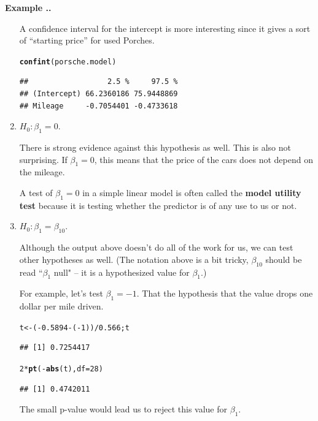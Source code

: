 \documentclass[twoside]{book}\usepackage[]{graphicx}\usepackage[]{xcolor}
\makeatletter
\newcommand{\hlnum}[1]{\textcolor[rgb]{0.686,0.059,0.569}{#1}}%
\newcommand{\hlopt}[1]{\textcolor[rgb]{0,0,0}{#1}}%
\newcommand{\hlstd}[1]{\textcolor[rgb]{0.345,0.345,0.345}{#1}}%
\newcommand{\hlkwb}[1]{\textcolor[rgb]{0.69,0.353,0.396}{#1}}%
\newcommand{\hlkwc}[1]{\textcolor[rgb]{0.333,0.667,0.333}{#1}}%
\newcommand{\hlkwd}[1]{\textcolor[rgb]{0.737,0.353,0.396}{\textbf{#1}}}%
\newenvironment{kframe}{%
 \def\at@end@of@kframe{}%
 \ifinner\ifhmode%
  \def\at@end@of@kframe{\end{minipage}}%
  \begin{minipage}{\columnwidth}%
 \fi\fi%
 \def\FrameCommand##1{\hskip\@totalleftmargin \hskip-\fboxsep
 \colorbox{shadecolor}{##1}\hskip-\fboxsep
     \hskip-\linewidth \hskip-\@totalleftmargin \hskip\columnwidth}%
 \MakeFramed {\advance\hsize-\width
   \@totalleftmargin\z@ \linewidth\hsize
   \@setminipage}}%
 {\par\unskip\endMakeFramed%
 \at@end@of@kframe}
\newenvironment{knitrout}{}{} %
\def\term#1{\textbf{#1}}
\newcounter{example}[section]
\newenvironment{example}%
{\refstepcounter{example}%
\textbf{Example \thesection.\arabic{example}. }}%
{}
\makeatother
\begin{document}
\begin{example}
\begin{enumerate}
		A confidence interval for the intercept is more interesting since it gives a sort 
		of ``starting price'' for used Porches.
\begin{knitrout}
\color{fgcolor}\begin{kframe}
\begin{alltt}
\hlkwd{confint}\hlstd{(porsche.model)}
\end{alltt}
\begin{verbatim}
##                  2.5 %     97.5 %
## (Intercept) 66.2360186 75.9448869
## Mileage     -0.7054401 -0.4733618
\end{verbatim}
\end{kframe}
\end{knitrout}


	\item
		$H_0: \beta_1 = 0$.

		There is strong evidence against this hypothesis as well.  This is also not surprising.
		If $\beta_1 = 0$, this means that the price of the cars does not depend on the mileage.

		A test of $\beta_1=0$ in a simple linear model is often called the \term{model utility test}
		because it is testing whether the predictor is of any use to us or not.

	\item
		$H_0: \beta_1 = \beta_{10}$.

		Although the output above doesn't do all of the work for us, we can test other
		hypotheses as well.  (The notation above is a bit tricky, $\beta_{10}$ should be read
		``$\beta_1$ null" -- it is a hypothesized value for $\beta_1$.)
		
		For example, let's test $\beta_1 = -1$.  That the hypothesis that the value 
		drops one dollar per mile driven.

\begin{knitrout}
\color{fgcolor}\begin{kframe}
\begin{alltt}
\hlstd{t} \hlkwb{<-} \hlstd{(}\hlopt{-}\hlnum{0.5894} \hlopt{-} \hlstd{(}\hlopt{-}\hlnum{1}\hlstd{) )} \hlopt{/} \hlnum{0.566}\hlstd{; t}
\end{alltt}
\begin{verbatim}
## [1] 0.7254417
\end{verbatim}
\begin{alltt}
\hlnum{2} \hlopt{*} \hlkwd{pt}\hlstd{(} \hlopt{-} \hlkwd{abs}\hlstd{(t),} \hlkwc{df}\hlstd{=}\hlnum{28} \hlstd{)}
\end{alltt}
\begin{verbatim}
## [1] 0.4742011
\end{verbatim}
\end{kframe}
\end{knitrout}
The small p-value would lead us to reject this value for $\beta_1$.
\end{enumerate}
\end{example}
\end{document}
